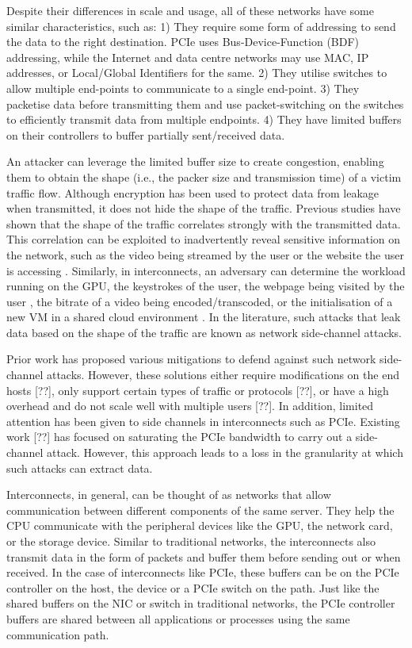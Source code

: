 Despite their differences in scale and usage, all of these networks have some similar characteristics, such as:
1) They require some form of addressing to send the data to the right destination. PCIe uses Bus-Device-Function (BDF) addressing, while the Internet and data centre networks may use MAC, IP addresses, or Local/Global Identifiers for the same. 
2) They utilise switches to allow multiple end-points to communicate to a single end-point. 
3) They packetise data before transmitting them and use packet-switching on the switches to efficiently transmit data from multiple endpoints. 
4) They have limited buffers on their controllers to buffer partially sent/received data.

An attacker can leverage the limited buffer size to create congestion, enabling them to obtain the shape (i.e., the packer size and transmission time) of a victim traffic flow.
Although encryption has been used to protect data from leakage when transmitted, it does not hide the shape of the traffic.
Previous studies have shown that the shape of the traffic correlates strongly with the transmitted data. 
This correlation can be exploited to inadvertently reveal sensitive information on the network, such as the video being streamed by the user \cite{schuster2017beautyburst} or the website the user is accessing \cite{bhat2019varcnn, wang2014supersequence}. 
Similarly, in interconnects, an adversary can determine the workload running on the GPU, the keystrokes of the user, the webpage being visited by the user \cite{tan2021invisible}, the bitrate of a video being encoded/transcoded, or the initialisation of a new VM in a shared cloud environment \cite{giechaskiel2022cross}. 
In the literature, such attacks that leak data based on the shape of the traffic are known as network side-channel attacks.

Prior work has proposed various mitigations to defend against such network side-channel attacks. However, these solutions either require modifications on the end hosts [??], %
only support certain types of traffic or protocols [??], %
or have a high overhead and do not scale well with multiple users [??]. %
In addition, limited attention has been given to side channels in interconnects such as PCIe. 
Existing work [??] has focused on saturating the PCIe bandwidth to carry out a side-channel attack. However, this approach leads to a loss in the granularity at which such attacks can extract data.

Interconnects, in general, can be thought of as networks that allow communication between different components of the same server. 
They help the CPU communicate with the peripheral devices like the GPU, the network card, or the storage device. 
Similar to traditional networks, the interconnects also transmit data in the form of packets and buffer them before sending out or when received.
In the case of interconnects like PCIe, these buffers can be on the PCIe controller on the host, the device or a PCIe switch on the path.
Just like the shared buffers on the NIC or switch in traditional networks, the PCIe controller buffers are shared between all applications or processes using the same communication path.

